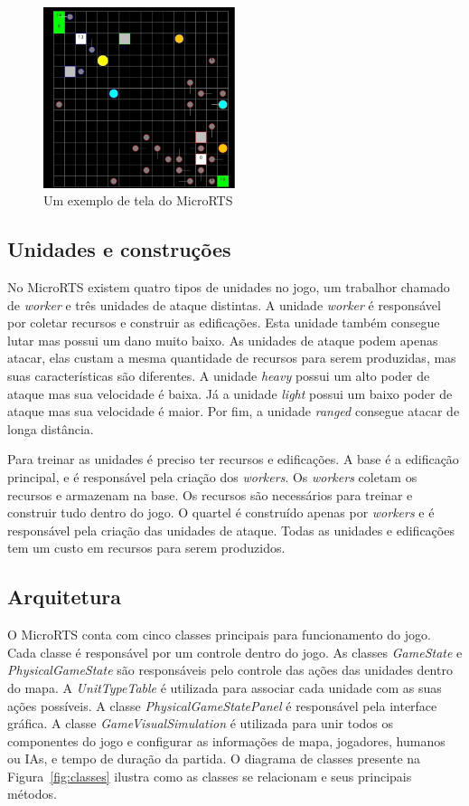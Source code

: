 \begin{figure}[ht]
	\centering
	\includegraphics[width=0.5\textwidth]{fig/microrts.pdf}
	\caption{Um exemplo de tela do MicroRTS}
	\label{fig:microrts}
\end{figure} 

\subsection{Unidades e construções}

No MicroRTS existem quatro tipos de unidades no jogo, um trabalhor chamado de \textit{worker} e três unidades de ataque distintas.
A unidade \textit{worker} é responsável por coletar recursos e construir as edificações. 
Esta unidade também consegue lutar mas possui um dano muito baixo.
As unidades de ataque podem apenas atacar, elas custam a mesma quantidade de recursos para serem produzidas, mas suas características são diferentes. 
A unidade \textit{heavy} possui um alto poder de ataque mas sua velocidade é baixa.
Já a unidade \textit{light} possui um baixo poder de ataque mas sua velocidade é maior.
Por fim, a unidade \textit{ranged} consegue atacar de longa distância. 

Para treinar as unidades é preciso ter recursos e edificações. 
A base é a edificação principal, e é responsável pela criação dos \textit{workers}.
Os \textit{workers} coletam os recursos e armazenam na base.
Os recursos são necessários para treinar e construir tudo dentro do jogo. 
O quartel é construído apenas por \textit{workers} e é responsável pela criação das unidades de ataque. 
Todas as unidades e edificações tem um custo em recursos para serem produzidos.

\subsection{Arquitetura}

O MicroRTS conta com cinco classes principais para funcionamento do jogo. 
Cada classe é responsável por um controle dentro do jogo.
As classes \textit{GameState} e \textit{PhysicalGameState} são responsáveis pelo controle das ações das unidades dentro do mapa.
A \textit{UnitTypeTable} é utilizada para associar cada unidade com as suas ações possíveis.
A classe \textit{PhysicalGameStatePanel} é responsável pela interface gráfica.
A classe \textit{GameVisualSimulation} é utilizada para unir todos os componentes do jogo e configurar as informações de mapa, jogadores, humanos ou IAs, e tempo de duração da partida.
O diagrama de classes presente na Figura~\ref{fig:classes} ilustra como as classes se relacionam e seus principais métodos.

